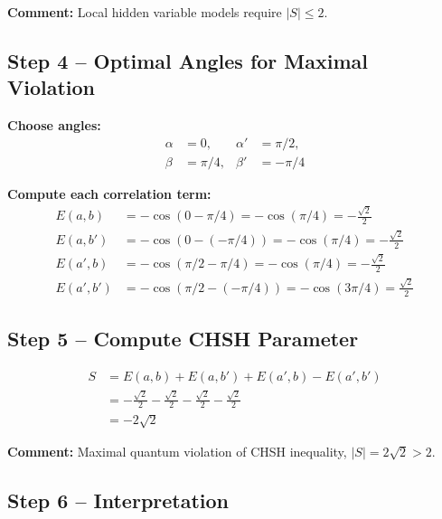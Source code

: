 \documentclass[12pt,a4paper]{article}
\begin{document}
\textbf{Comment:} Local hidden variable models require $|S| \leq 2$.

\subsection{Step 4 – Optimal Angles for Maximal Violation}

\textbf{Choose angles:}
\begin{align}
	\alpha &= 0, & \alpha' &= \pi/2, \\
	\beta &= \pi/4, & \beta' &= -\pi/4
\end{align}

\textbf{Compute each correlation term:}
\begin{align}
	E(a,b) &= -\cos(0-\pi/4) = -\cos(\pi/4) = -\frac{\sqrt{2}}{2} \\
	E(a,b') &= -\cos(0-(-\pi/4)) = -\cos(\pi/4) = -\frac{\sqrt{2}}{2} \\
	E(a',b) &= -\cos(\pi/2-\pi/4) = -\cos(\pi/4) = -\frac{\sqrt{2}}{2} \\
	E(a',b') &= -\cos(\pi/2-(-\pi/4)) = -\cos(3\pi/4) = \frac{\sqrt{2}}{2}
\end{align}

\subsection{Step 5 – Compute CHSH Parameter}

\begin{align}
	S &= E(a,b) + E(a,b') + E(a',b) - E(a',b') \\
	&= -\frac{\sqrt{2}}{2} - \frac{\sqrt{2}}{2} - \frac{\sqrt{2}}{2} - \frac{\sqrt{2}}{2} \\
	&= -2\sqrt{2}
\end{align}

\textbf{Comment:} Maximal quantum violation of CHSH inequality, $|S| = 2\sqrt{2} > 2$.

\subsection{Step 6 – Interpretation}
\end{document}
